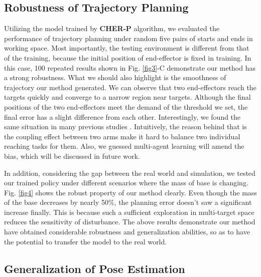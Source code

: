 \documentclass{article}
\begin{document}
\subsection{Robustness of Trajectory Planning}

Utilizing the model trained by \textbf{CHER-P} algorithm, we evaluated the performance of trajectory planning under random five pairs of starts and ends in working space. Most importantly, the testing environment is different from that of the training, because the initial position of end-effector is fixed in training. In this case, 100 repeated results shown in Fig. \ref{fig3}-C demonstrate our method has a strong robustness. What we should also highlight is the smoothness of trajectory our method generated. We can observe that two end-effectors reach the targets quickly and converge to a narrow region near targets. Although the final positions of the two end-effectors meet the demand of the threshold we set, the final error has a slight difference from each other. Interestingly, we found the same situation in many previous studies \cite{2020Reinforcement,li2021constrained}. Intuitively, the reason behind that is the coupling effect between two arms make it hard to balance two individual reaching tasks for them. Also, we guessed multi-agent learning will amend the bias, which will be discussed in future work.

In addition, considering the gap between the real world and simulation, we tested our trained policy under different scenarios where the mass of base is changing. Fig. \ref{fig4} shows the robust property of our method clearly. Even though the mass of the base decreases by nearly 50\%, the planning error doesn't saw a significant increase finally. This is because such a sufficient exploration in multi-target space reduces the sensitivity of disturbance. The above results demonstrate our method have obtained considerable robustness and generalization abilities, so as to have the potential to transfer the model to the real world.



\subsection{Generalization of Pose Estimation}
\end{document}
